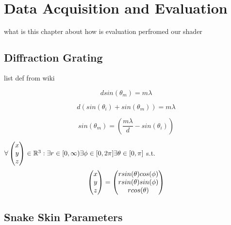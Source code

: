 \section{Data Acquisition and Evaluation}
what is this chapter about
how is evaluation perfromed
our shader


\subsection{Diffraction Grating}
list def from wiki

\begin{equation*}
d sin(\theta_m) = m\lambda
\end{equation*}

\begin{equation*}
d(sin(\theta_i) + sin(\theta_m)) = m \lambda
\end{equation*}

\begin{equation*}
sin(\theta_m) = \left(\frac{m\lambda}{d}-sin(\theta_i)\right)
\end{equation*}


$\forall \colvec[x]{y}{z} \in \mathbb{R}^3 : \exists r \in [0,\infty) \exists \phi \in [0,2\pi] \exists \theta \in [0,\pi] $ s.t.
\begin{equation*}
\colvec[x]{y}{z} = \colvec[r sin(\theta)cos(\phi)]{r sin(\theta)sin(\phi)}{r cos(\theta)}
\end{equation*}

\subsection{Snake Skin Parameters}